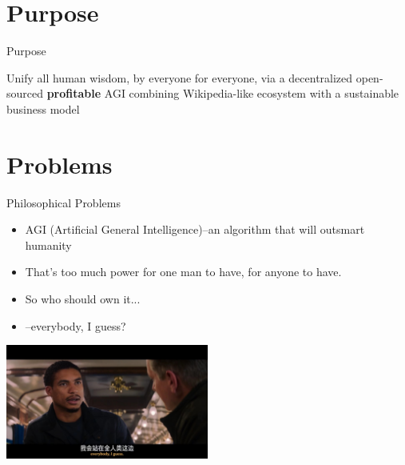 \documentclass{beamer}
\begin{document}
\section{Purpose}
\begin{frame}{Purpose}
\begin{center}
Unify all human wisdom, by everyone for everyone, via a decentralized open-sourced \textbf{profitable} AGI 
\linebreak
\linebreak
{\scriptsize combining Wikipedia-like ecosystem with a sustainable business model}
\end{center}
\end{frame}

\section{Problems}
\begin{frame}{Philosophical Problems}
\begin{itemize}
    \item AGI (Artificial General Intelligence)--an algorithm that will outsmart humanity
    \item That's too much power for one man to have, for anyone to have.
    \item So who should own it...
    \item --everybody, I guess?
\end{itemize}
\begin{center}
\includegraphics[width=0.5\textwidth]{images/everybody.JPG}
\end{center}
\end{frame}
\end{document}

